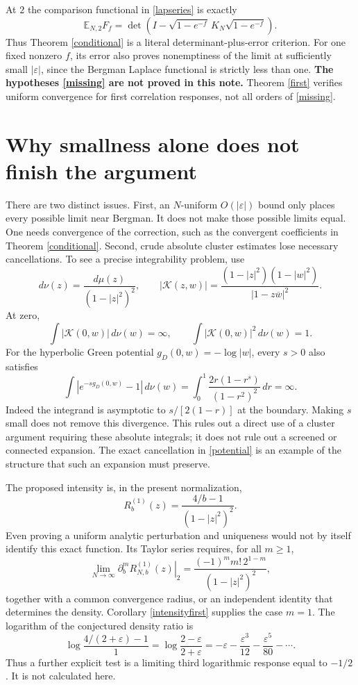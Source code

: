 \documentclass[11pt]{article}
\theoremstyle{remark}\newtheorem{remark}[theorem]{Remark}
\newcommand{\E}{\mathbb E}
\begin{document}
At $2$ the comparison functional in \eqref{lapseries} is exactly
\[
 \E_{N,2}F_f=
 \det\!\left(I-\sqrt{1-e^{-f}}\,K_N\sqrt{1-e^{-f}}\right).
\]
Thus Theorem \ref{conditional} is a literal determinant-plus-error
criterion. For one fixed nonzero $f$, its error also proves nonemptiness
of the limit at sufficiently small $|\varepsilon|$, since the Bergman
Laplace functional is strictly less than one.
\textbf{The hypotheses \eqref{missing} are not proved in this note.}
Theorem \ref{first} verifies uniform convergence for first correlation
responses, not all orders of \eqref{missing}.

\section{Why smallness alone does not finish the argument}
There are two distinct issues. First, an $N$-uniform $O(|\varepsilon|)$
bound only places every possible limit near Bergman. It does not make
those possible limits equal. One needs convergence of the correction,
such as the convergent coefficients in Theorem \ref{conditional}.
Second, crude absolute cluster estimates lose necessary cancellations.
To see a precise integrability problem, use
\[
 d\nu(z)=\frac{d\mu(z)}{(1-|z|^2)^2},\qquad
 |\mathcal K(z,w)|=
 \frac{(1-|z|^2)(1-|w|^2)}{|1-z\overline w|^2}.
\]
At zero,
\[
 \int|\mathcal K(0,w)|\,d\nu(w)=\infty,\qquad
 \int|\mathcal K(0,w)|^2\,d\nu(w)=1.
\]
For the hyperbolic Green potential $g_D(0,w)=-\log|w|$, every $s>0$
also satisfies
\[
 \int|e^{-s g_D(0,w)}-1|\,d\nu(w)
 =\int_0^1\frac{2r(1-r^s)}{(1-r^2)^2}\,dr=\infty.
\]
Indeed the integrand is asymptotic to $s/[2(1-r)]$ at the boundary.
Making $s$ small does not remove this divergence. This rules out a direct
use of a cluster argument requiring these absolute integrals; it does not
rule out a screened or connected expansion. The exact cancellation in
\eqref{potential} is an example of the structure that such an expansion
must preserve.

The proposed intensity is, in the present normalization,
\[
 R_b^{(1)}(z)=\frac{4/b-1}{(1-|z|^2)^2}.
\]
Even proving a uniform analytic perturbation and uniqueness would not by
itself identify this exact function. Its Taylor series requires, for all
$m\ge1$,
\[
 \lim_{N\to\infty}\left.\partial_b^m R_{N,b}^{(1)}(z)\right|_2
 =\frac{(-1)^m m!\,2^{1-m}}{(1-|z|^2)^2},
\]
together with a common convergence radius, or an independent identity
that determines the density. Corollary \ref{intensityfirst} supplies the
case $m=1$. The logarithm of the conjectured density ratio is
\[
 \log\frac{4/(2+\varepsilon)-1}{1}
 =\log\frac{2-\varepsilon}{2+\varepsilon}
 =-\varepsilon-\frac{\varepsilon^3}{12}-\frac{\varepsilon^5}{80}-\cdots.
\]
Thus a further explicit test is a limiting third logarithmic response
equal to $-1/2$. It is not calculated here.
\end{document}
